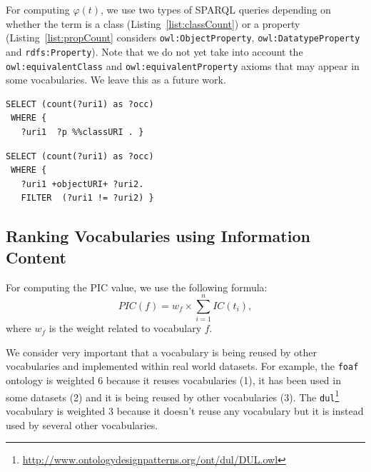 For computing $\varphi(t)$, we use two types of SPARQL queries depending on whether the term is a class (Listing~\ref{list:classCount}) or a property (Listing~\ref{list:propCount} considers \texttt{owl:ObjectProperty}, \texttt{owl:Data\-typeProperty} and \texttt{rdfs:Property}). Note that we do not yet take into account the \texttt{owl:equivalentClass} and \texttt{owl:equi\-valentProperty} axioms that may appear in some vocabularies. We leave this as a future work.

\begin{lstlisting}[float=htb,caption={SPARQL query for computing the occurrence of a class },label=list:classCount]
 SELECT (count(?uri1) as ?occ)
 WHERE {
   ?uri1  ?p %%classURI . }
\end{lstlisting}

\begin{lstlisting}[float=htb,caption={SPARQL query for computing the occurrence of a property },label=list:propCount]
 SELECT (count(?uri1) as ?occ)
 WHERE {
   ?uri1 +objectURI+ ?uri2.
   FILTER  (?uri1 != ?uri2) }
\end{lstlisting}

\subsection{Ranking Vocabularies using Information Content}
For computing the PIC value, we use the following formula:
\begin{equation}
 PIC(f) =  w_{f} \times \sum_{i=1}^{n}IC(t_{i})  ,
\end{equation}
where $w_{f}$ is the weight related to vocabulary $f$.

We consider very important that a vocabulary is being reused by other vocabularies and implemented within real world datasets. For example, the \texttt{foaf} ontology is weighted $6$ because it reuses vocabularies (1), it has been used in some datasets (2) and it is being reused by other vocabularies (3). The \texttt{dul}\footnote{\url{http://www.ontologydesignpatterns.org/ont/dul/DUL.owl}} vocabulary is weighted $3$ because it doesn't reuse any vocabulary but it is instead used by several other vocabularies.
\vspace{-0.2cm}


